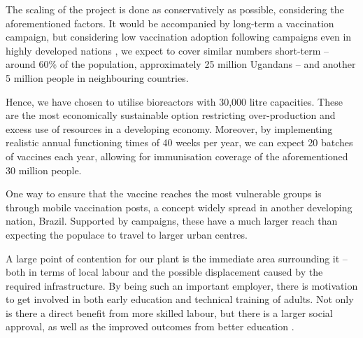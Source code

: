 The scaling of the project is done as conservatively as possible, considering the aforementioned factors. It would be accompanied by long-term a vaccination campaign\cite{GomezM.N.Altet1993Reot}, but considering low vaccination adoption following campaigns even in highly developed nations \cite{BjorkmanIngeborg2013TSAv} , we expect to cover similar numbers short-term -- around 60\% of the population, approximately 25 million Ugandans -- and another 5 million people in neighbouring countries. 

Hence, we have chosen to utilise bioreactors with 30,000 litre capacities. These are the most economically sustainable option restricting over-production and excess use of resources in a developing economy. Moreover, by implementing realistic annual functioning times of 40 weeks per year, we can expect 20 batches of vaccines each year, allowing for immunisation coverage of the aforementioned 30 million people.  

One way to ensure that the vaccine reaches the most vulnerable groups is through mobile vaccination posts, a concept widely spread in another developing nation, Brazil. Supported by campaigns, these have a much larger reach than expecting the populace to travel to larger urban centres. 

A large point of contention for our plant is the immediate area surrounding it – both in terms of local labour and the possible displacement caused by the required infrastructure. By being such an important employer, there is motivation to get involved in both early education and technical training of adults. Not only is there a direct benefit from more skilled labour, but there is a larger social approval, as well as the  improved outcomes from better education \cite{OreopoulosPhilip2013MCWI}.